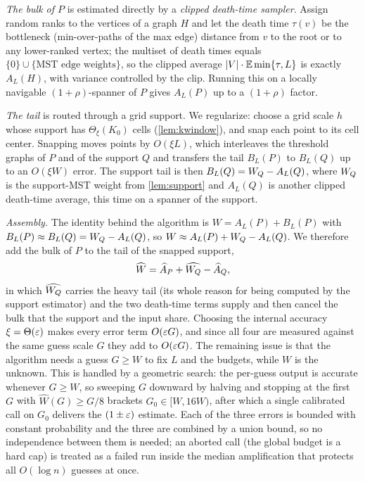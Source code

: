 \emph{The bulk of $P$} is estimated directly by a \emph{clipped death-time sampler}. Assign random ranks
to the vertices of a graph $H$ and let the death time $\tau(v)$ be the bottleneck (min-over-paths of the
max edge) distance from $v$ to the root or to any lower-ranked vertex; the multiset of death times equals
$\{0\}\cup\{\text{MST edge weights}\}$, so the clipped average $\left|V\right|\cdot\mathbb{E}\min\{\tau,L\}$ is exactly
$A_L(H)$, with variance controlled by the clip. Running this on a locally navigable $(1+\rho)$-spanner of
$P$ gives $A_L(P)$ up to a $(1+\rho)$ factor.

\emph{The tail} is routed through a grid support. We regularize: choose a grid scale $h$ whose support has
$\Theta_\xi(K_0)$ cells (\cref{lem:kwindow}), and snap each point to its cell center. Snapping moves points by
$O(\xi L)$, which interleaves the threshold graphs of $P$ and of the support $Q$ and transfers the tail
$B_L(P)$ to $B_L(Q)$ up to an $O(\xi W)$ error. The support tail is then $B_L(Q)=W_Q-A_L(Q)$, where $W_Q$
is the support-MST weight from \cref{lem:support} and $A_L(Q)$ is another clipped death-time average, this
time on a spanner of the support.

\emph{Assembly.} The identity behind the algorithm is $W=A_L(P)+B_L(P)$ with $B_L(P)\approx B_L(Q)=
W_Q-A_L(Q)$, so $W\approx A_L(P)+W_Q-A_L(Q)$. We therefore add the bulk of $P$ to the tail of the snapped
support,
\begin{equation}\label{eq:ov-assembly}
  \widehat W=\widehat A_P+\widehat{W_Q}-\widehat A_Q ,
\end{equation}
in which $\widehat{W_Q}$ carries the heavy tail (its whole reason for being computed by the support
estimator) and the two death-time terms supply and then cancel the bulk that the support and the input
share. Choosing the internal accuracy $\xi=\Theta(\varepsilon)$ makes every error term $O(\varepsilon G)$, and since all
four are measured against the same guess scale $G$ they add to $O(\varepsilon G)$. The remaining issue is that the
algorithm needs a guess $G\ge W$ to fix $L$ and the budgets, while $W$ is the unknown. This is handled by a
geometric search: the per-guess output is accurate whenever $G\ge W$, so sweeping $G$ downward by halving
and stopping at the first $G$ with $\widehat W(G)\ge G/8$ brackets $G_0\in[W,16W)$, after which a single
calibrated call on $G_0$ delivers the $(1\pm\varepsilon)$ estimate. Each of the three errors is bounded with
constant probability and the three are combined by a union bound, so no independence between them is
needed; an aborted call (the global budget is a hard cap) is treated as a failed run inside the median
amplification that protects all $O(\log n)$ guesses at once.

